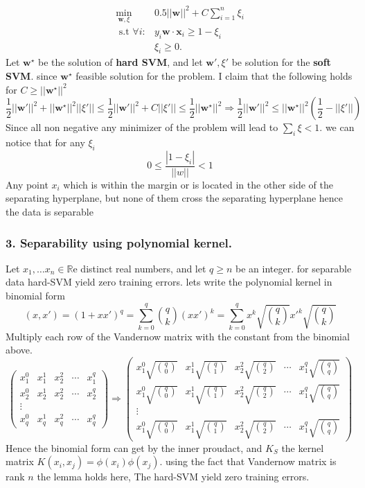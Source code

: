 \documentclass[12pt]{article}
\theoremstyle{plain}
\begin{document}
\[\begin{array}{ll}
\underset{\mathbf{w},\xi}{\text{min}} & 0.5||\mathbf{w}||^2 + C\sum^n_{i=1}\xi_i \\

\text{ s.t } \forall i: & y_i\mathbf{w\cdot x}_i \ge 1-\xi_i \\
&\xi_i \ge 0.
\end{array}\]
Let $\mathbf{w}^\star$ be the solution of\textbf{ hard SVM}, and let $\mathbf{w}',\xi '$ be   solution for the \textbf{ soft SVM}. since $\mathbf{w}^\star$ feasible  solution for the problem.  I claim that the  following holds for  $C\geq||\mathbf{w}^\star||^2$
\[\frac{1}{2}||\mathbf{w'}||^2+||\mathbf{w}^\star||^2||\xi'||\leq\frac{1}{2}||\mathbf{w'}||^2+C||\xi'||\leq\frac{1}{2}||\mathbf{w}^\star||^2\Rightarrow \frac{1}{2}||\mathbf{w'}||^2\leq ||\mathbf{w}^\star||^2(\frac{1}{2}-||\xi'||)
\]
Since all non negative any minimizer of the problem will lead to $\sum_i \xi < 1$. we can notice that for any $\xi_i$
\[0\leq \frac{|1-\xi_i|}{||w||}<1
\] 
Any point  
$x_i$
 which is within the margin or is located in the other side of the separating hyperplane, but none of them cross the separating hyperplane hence the data is separable
\subsubsection*{ 3.  Separability using polynomial kernel. }
Let $x_1,\dots x_n \in \mathbb{R}$e distinct real
numbers, and let $q \geq n$ be an integer.
for separable data hard-SVM yield zero training errors. lets write the  polynomial kernel in binomial form
\[
(x,x')=(1+xx')^q=\sum^q_{k=0}\binom{q}{k}(xx')^k=\sum^q_{k=0}x^k\sqrt{\binom{q}{k}}x'^k\sqrt{\binom{q}{k}}
\] 
 Multiply each row of the Vandernow matrix with the constant from the binomial above.
\[
\begin{pmatrix}
x_1^0 & x_1^1 & x_2^2 & \cdots  & x_1^q \\
x_2^0 & x_2^1 & x_2^2 & \cdots  & x_2^q\\
\vdots &  &  & &    \\
x_q^0 & x_q^1 & x_q^2 & \cdots  & x_q^q
\end{pmatrix}
\Rightarrow
\begin{pmatrix}
x_1^0\sqrt{\binom{q}{0}} & x_1^1\sqrt{\binom{q}{1}} & x_2^2\sqrt{\binom{q}{2}} & \cdots  & x_1^q\sqrt{\binom{q}{q}} \\
x_1^0\sqrt{\binom{q}{0}} & x_1^1\sqrt{\binom{q}{1}} & x_2^2\sqrt{\binom{q}{2}} & \cdots  & x_1^q\sqrt{\binom{q}{q}}\\
\vdots &  &  & &    \\
x_1^0\sqrt{\binom{q}{0}} & x_1^1\sqrt{\binom{q}{1}} & x_2^2\sqrt{\binom{q}{2}} & \cdots  & x_1^q\sqrt{\binom{q}{q}}\end{pmatrix}
\]
Hence the binomial form can get by the inner proudact,  and $K_S$ the kernel matrix  $K(x_i,x_j)=\phi(x_i)\phi(x_j)$. using the fact that Vandernow matrix is rank $n$ the lemma holds here,  The hard-SVM yield zero training errors.
\end{document}

